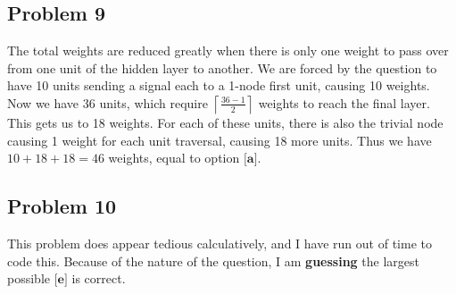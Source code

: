 \documentclass{article}
\begin{document}
\subsection*{Problem 9}
The total weights are reduced greatly when there is only one weight to pass over from one unit of the hidden layer to another. We are forced by the question to have 10 units sending a signal each to a 1-node first unit, causing 10 weights. Now we have 36 units, which require $\left\lceil\frac{36 - 1}{2}\right\rceil$ weights to reach the final layer. This gets us to 18 weights. For each of these units, there is also the trivial node causing 1 weight for each unit traversal, causing 18 more units. Thus we have $10 + 18 + 18 = 46$ weights, equal to option $\textbf{[a]}$. 
\subsection*{Problem 10}
This problem does appear tedious calculatively, and I have run out of time to code this. Because of the nature of the question, I am \textbf{guessing} the largest possible $\textbf{[e]}$ is correct.


\end{document}
